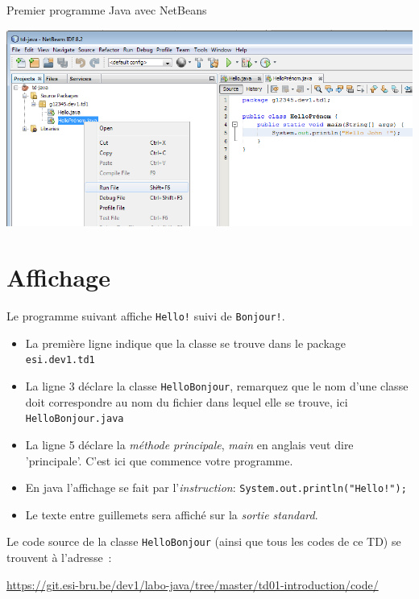 \documentclass[a4paper,11pt]{article}
\newcommand{\publicbasepath}{https://git.esi-bru.be/dev1/labo-java/tree/master/td01-introduction}
\renewcommand{\listingpublicpath}{\publicbasepath/code/}
\begin{document}
\begin{Tutoriel}{Premier programme Java avec NetBeans}
\begin{steps}
		\begin{center}
			\includegraphics[width=.9\textwidth]{images/nb_newproject_run_othermain}
		\end{center}

	\end{steps}

	\end{Tutoriel}

\section{Affichage}

	Le programme suivant affiche \texttt{Hello!} suivi de \texttt{Bonjour!}.

	\begin{itemize}
		\item La première ligne indique que la classe se trouve dans le package \texttt{esi.dev1.td1}
		\item La ligne 3 déclare la classe \texttt{HelloBonjour}, remarquez que le nom d'une classe 
			doit correspondre au nom du fichier dans lequel elle se trouve, ici \texttt{HelloBonjour.java}
		\item La ligne 5 déclare la \emph{méthode principale}, \emph{main} en anglais veut dire 'principale'.
			C'est ici que commence votre programme.
		\item En java l'affichage se fait par l'\emph{instruction}: \texttt{System.out.println("Hello!");}
		\item Le texte entre guillemets sera affiché sur la \emph{sortie standard}.
	\end{itemize}

	Le code source de la classe \texttt{HelloBonjour} (ainsi que tous les codes de ce TD) se trouvent à l'adresse~: 
	
	\url{\listingpublicpath}
	
\end{document}
